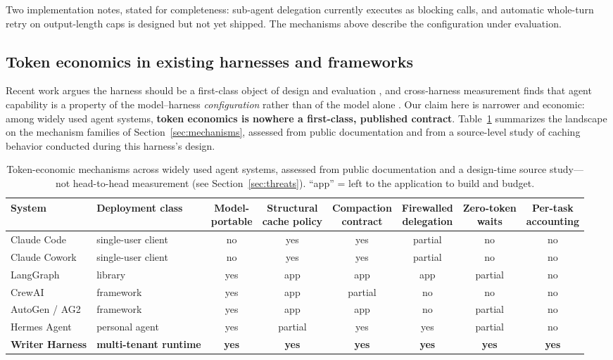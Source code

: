 \documentclass[11pt]{article}
\begin{document}
Two implementation notes, stated for completeness: sub-agent delegation currently executes as blocking calls, and automatic whole-turn retry on output-length caps is designed but not yet shipped. The mechanisms above describe the configuration under evaluation.

\subsection{Token economics in existing harnesses and frameworks}
\label{sec:landscape}

Recent work argues the harness should be a first-class object of design and evaluation \cite{harnessscaling}, and cross-harness measurement finds that agent capability is a property of the model--harness \emph{configuration} rather than of the model alone \cite{harnessbench}. Our claim here is narrower and economic: among widely used agent systems, \textbf{token economics is nowhere a first-class, published contract}. Table~\ref{tab:landscape} summarizes the landscape on the mechanism families of Section~\ref{sec:mechanisms}, assessed from public documentation and from a source-level study of caching behavior conducted during this harness's design.

\begin{table}[t]
\centering\footnotesize
\caption{Token-economic mechanisms across widely used agent systems, assessed from public documentation and a design-time source study---not head-to-head measurement (see Section~\ref{sec:threats}). ``app'' = left to the application to build and budget.}
\label{tab:landscape}
\begin{tabular}{@{}llcccccc@{}}
\toprule
System & Deployment class & \makecell{Model-\\portable} & \makecell{Structural\\cache policy} & \makecell{Compaction\\contract} & \makecell{Firewalled\\delegation} & \makecell{Zero-token\\waits} & \makecell{Per-task\\accounting} \\
\midrule
Claude Code & single-user client & no & yes & yes & partial & no & no \\
Claude Cowork & single-user client & no & yes & yes & partial & no & no \\
LangGraph & library & yes & app & app & app & partial & no \\
CrewAI & framework & yes & app & partial & no & no & no \\
AutoGen / AG2 & framework & yes & app & app & no & partial & no \\
Hermes Agent & personal agent & yes & partial & yes & yes & partial & no \\
\midrule
\textbf{Writer Harness} & \textbf{multi-tenant runtime} & \textbf{yes} & \textbf{yes} & \textbf{yes} & \textbf{yes} & \textbf{yes} & \textbf{yes} \\
\bottomrule
\end{tabular}
\end{table}
\end{document}
